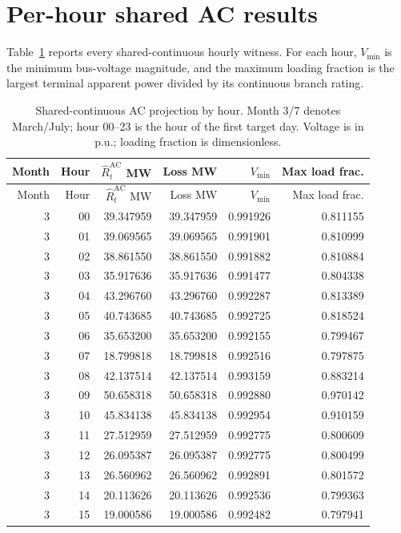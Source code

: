 \documentclass[10pt,journal,onecolumn]{IEEEtran}
\begin{document}
\section{Per-hour shared AC results}
Table~\ref{tab:hourly} reports every shared-continuous hourly witness. For each hour, $V_{\min}$ is the minimum bus-voltage magnitude, and the maximum loading fraction is the largest terminal apparent power divided by its continuous branch rating.
\footnotesize
\begin{longtable}{rrrrrr}
\caption{Shared-continuous AC projection by hour. Month 3/7 denotes March/July; hour 00--23 is the hour of the first target day. Voltage is in p.u.; loading fraction is dimensionless.}\label{tab:hourly}\\
\toprule
Month & Hour & $\widehat R_t^{\mathrm{AC}}$ MW & Loss MW & $V_{\min}$ & Max load frac.\\
\midrule
\endfirsthead
\toprule
Month & Hour & $\widehat R_t^{\mathrm{AC}}$ MW & Loss MW & $V_{\min}$ & Max load frac.\\
\midrule
\endhead
3 & 00 & 39.347959 & 39.347959 & 0.991926 & 0.811155\\
3 & 01 & 39.069565 & 39.069565 & 0.991901 & 0.810999\\
3 & 02 & 38.861550 & 38.861550 & 0.991882 & 0.810884\\
3 & 03 & 35.917636 & 35.917636 & 0.991477 & 0.804338\\
3 & 04 & 43.296760 & 43.296760 & 0.992287 & 0.813389\\
3 & 05 & 40.743685 & 40.743685 & 0.992725 & 0.818524\\
3 & 06 & 35.653200 & 35.653200 & 0.992155 & 0.799467\\
3 & 07 & 18.799818 & 18.799818 & 0.992516 & 0.797875\\
3 & 08 & 42.137514 & 42.137514 & 0.993159 & 0.883214\\
3 & 09 & 50.658318 & 50.658318 & 0.992880 & 0.970142\\
3 & 10 & 45.834138 & 45.834138 & 0.992954 & 0.910159\\
3 & 11 & 27.512959 & 27.512959 & 0.992775 & 0.800609\\
3 & 12 & 26.095387 & 26.095387 & 0.992775 & 0.800499\\
3 & 13 & 26.560962 & 26.560962 & 0.992891 & 0.801572\\
3 & 14 & 20.113626 & 20.113626 & 0.992536 & 0.799363\\
3 & 15 & 19.000586 & 19.000586 & 0.992482 & 0.797941\\

\end{longtable}
\end{document}
